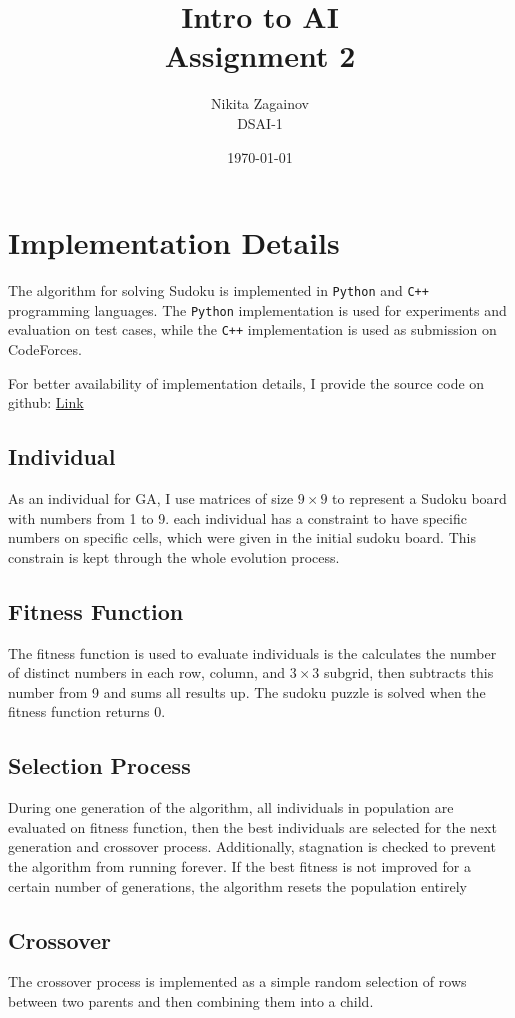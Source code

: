 \documentclass[12pt]{article}
\title{Intro to AI \\ Assignment 2}
\author{Nikita Zagainov \\ DSAI-1}
\date{\today}
\begin{document}
\maketitle

\section{Implementation Details}
The algorithm for solving Sudoku is implemented in
\texttt{Python} and \texttt{C++} programming languages.
The \texttt{Python} implementation is used for experiments
and evaluation on test cases, while the \texttt{C++}
implementation is used as submission on CodeForces.

For better availability of implementation details,
I provide the source code on github:
\href{https://github.com/V1adych/itai-genetic-sudoku-solver}{Link}

\subsection{Individual}
As an individual for GA, I use matrices
of size $9 \times 9$ to represent a Sudoku
board with numbers from 1 to 9.
each individual has a constraint to
have specific numbers on specific
cells, which were given in the initial
sudoku board. This constrain is kept through the
whole evolution process.

\subsection{Fitness Function}
The fitness function is used to evaluate
individuals is the calculates the number of
distinct numbers in each row, column, and
$3 \times 3$ subgrid, then subtracts this number from 9
and sums all results up. The sudoku puzzle is solved
when the fitness function returns 0.

\subsection{Selection Process}
During one generation of the algorithm, all individuals
in population are evaluated on fitness function,
then the best individuals are selected for the next
generation and crossover process. Additionally,
stagnation is checked to prevent the algorithm from
running forever. If the best fitness is not improved
for a certain number of generations, the algorithm
resets the population entirely

\subsection{Crossover}
The crossover process is implemented as a simple
random selection of rows between two parents and
then combining them into a child.
\end{document}
